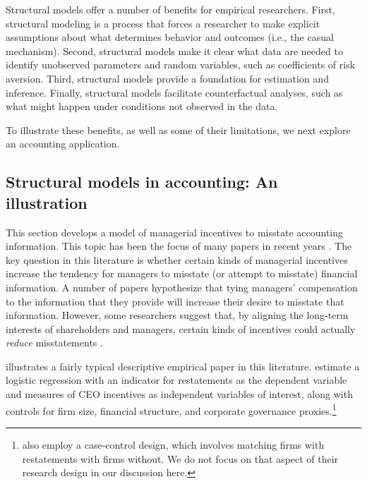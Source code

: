 \documentclass[12pt,reqno,titlepage]{amsart}
\theoremstyle{definition}
\begin{document}
\begin{doublespace}
Structural models offer a number of benefits for empirical researchers.
First, structural modeling is a process that forces a researcher to make explicit assumptions about what determines behavior and outcomes (i.e., the casual mechanism). 
Second, structural models make it clear what data are needed to identify unobserved parameters and random variables, such as coefficients of risk aversion.
Third, structural models provide a foundation for estimation and inference. 
Finally, structural models facilitate counterfactual analyses, such as what might happen under conditions not observed in the data. 

To illustrate these benefits, as well as some of their limitations, we next explore an accounting application.

\subsection{Structural models in accounting: An illustration}
This section develops a model of managerial incentives to misstate accounting information. 
This topic has been the focus of many papers in recent years \citep[see the review in][]{Armstrong:2010jd}.
The key question in this literature is whether certain kinds of managerial incentives increase the tendency for managers to misstate (or attempt to misstate) financial information.
A number of papers hypothesize that tying managers' compensation to the information that they provide will increase their desire to misstate that information.
However, some researchers suggest that, by aligning the long-term interests of shareholders and managers, certain kinds of incentives could actually \emph{reduce} misstatements \citep{Burns:2006ce}.

\citet{Efendi:2007ja} illustrates a fairly typical descriptive empirical paper in this literature. 
\citet[p.\,687]{Efendi:2007ja} estimate a logistic regression with an indicator for restatements as the dependent variable and measures of CEO incentives as independent variables of interest, along with controls for firm size, financial structure, and corporate governance proxies.\footnote{
\citet{Efendi:2007ja} also employ a case-control design, which involves matching firms with restatements with firms without.
We do not focus on that aspect of their research design in our discussion here.}
 

\end{doublespace}
\end{document}
